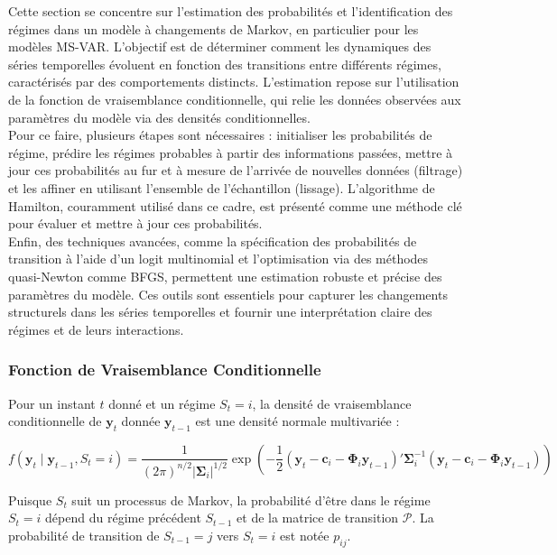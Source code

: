 \begin{sloppypar}
Cette section se concentre sur l'estimation des probabilités et l'identification des régimes dans un modèle à changements de Markov, en particulier pour les modèles MS-VAR. L'objectif est de déterminer comment les dynamiques des séries temporelles évoluent en fonction des transitions entre différents régimes, caractérisés par des comportements distincts. L'estimation repose sur l'utilisation de la fonction de vraisemblance conditionnelle, qui relie les données observées aux paramètres du modèle via des densités conditionnelles.\\

Pour ce faire, plusieurs étapes sont nécessaires : initialiser les probabilités de régime, prédire les régimes probables à partir des informations passées, mettre à jour ces probabilités au fur et à mesure de l'arrivée de nouvelles données (filtrage) et les affiner en utilisant l'ensemble de l'échantillon (lissage). L'algorithme de Hamilton, couramment utilisé dans ce cadre, est présenté comme une méthode clé pour évaluer et mettre à jour ces probabilités.\\

Enfin, des techniques avancées, comme la spécification des probabilités de transition à l'aide d'un logit multinomial et l'optimisation via des méthodes quasi-Newton comme BFGS, permettent une estimation robuste et précise des paramètres du modèle. Ces outils sont essentiels pour capturer les changements structurels dans les séries temporelles et fournir une interprétation claire des régimes et de leurs interactions.

\subsubsection{Fonction de Vraisemblance Conditionnelle}

Pour un instant \( t \) donné et un régime \( S_t = i \), la densité de vraisemblance conditionnelle de \( \bm{y}_t \) donnée \( \bm{y}_{t-1} \) est une densité normale multivariée :

\begin{equation}
f(\bm{y}_t \mid \bm{y}_{t-1}, S_t = i) = \frac{1}{(2\pi)^{n/2} |\bm{\Sigma}_i|^{1/2}} \exp \left( -\frac{1}{2} (\bm{y}_t - \bm{c}_i - \bm{\Phi}_i \bm{y}_{t-1})' \bm{\Sigma}_i^{-1} (\bm{y}_t - \bm{c}_i - \bm{\Phi}_i \bm{y}_{t-1}) \right)
\end{equation}

Puisque \( S_t \) suit un processus de Markov, la probabilité d'être dans le régime \( S_t = i \) dépend du régime précédent \( S_{t-1} \) et de la matrice de transition \( \mathcal{P} \). La probabilité de transition de \( S_{t-1} = j \) vers \( S_t = i \) est notée \( p_{ij} \).\\


\end{sloppypar}
